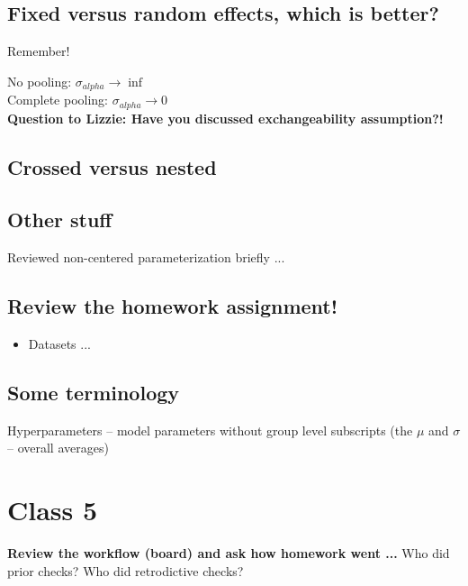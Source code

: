 \documentclass[11pt]{article}
\begin{document}

\subsection{Fixed versus random effects, which is better?}
Remember!

No pooling: $\sigma_{alpha} \rightarrow \inf$\\ %
Complete pooling: $\sigma_{alpha} \rightarrow 0$\\


{\bf Question to Lizzie: Have you discussed exchangeability assumption?!}

\subsection{Crossed versus nested} %

\subsection{Other stuff}
Reviewed non-centered parameterization briefly ... 

\subsection{Review the homework assignment!}
\begin{itemize}
\item Datasets ... 
\end{itemize}

\subsection{Some terminology} %
Hyperparameters -- model parameters without group level subscripts (the $\mu$ and $\sigma$ -- overall averages)


\newpage
\section{Class 5} 

{\bf Review the workflow (board) and ask how homework went ... } Who did prior checks? Who did retrodictive checks?
\end{document}

